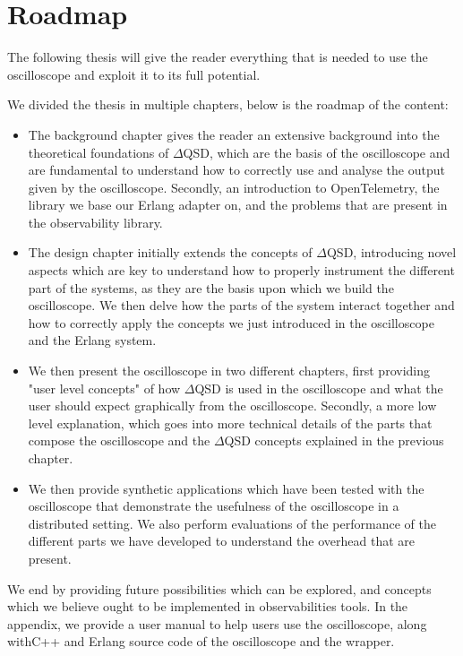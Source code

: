 \section{Roadmap}
    The following thesis will give the reader everything that is needed to use the oscilloscope and exploit it to its full potential.

    We divided the thesis in multiple chapters, below is the roadmap of the content:
    \begin{itemize}
        \item The background chapter gives the reader an extensive background into the theoretical foundations of $\Delta$QSD, which are the basis of the oscilloscope and are fundamental to understand how to correctly use and analyse the output given by the oscilloscope. Secondly, an introduction to OpenTelemetry, the library we base our Erlang adapter on, and the problems that are present in the observability library.
        \item The design chapter initially extends the concepts of $\Delta$QSD, introducing novel aspects which are key to understand how to properly instrument the different part of the systems, as they are the basis upon which we build the oscilloscope. We then delve how the parts of the system interact together and how to correctly apply the concepts we just introduced in the oscilloscope and the Erlang system.
        \item We then present the oscilloscope in two different chapters, first providing "user level concepts" of how $\Delta$QSD is used in the oscilloscope and what the user should expect graphically from the oscilloscope.
            Secondly, a more low level explanation, which goes into more technical details of the parts that compose the oscilloscope and the $\Delta$QSD concepts explained in the previous chapter.
        \item We then provide synthetic applications which have been tested with the oscilloscope that demonstrate the usefulness of the oscilloscope in a distributed setting. We also perform evaluations of the performance of the different parts we have developed to understand the overhead that are present.
    \end{itemize}

    We end by providing future possibilities which can be explored, and concepts which we believe ought to be implemented in observabilities tools. 
    In the appendix, we provide a user manual to help users use the oscilloscope, along withC++ and Erlang source code of the oscilloscope and the wrapper.
